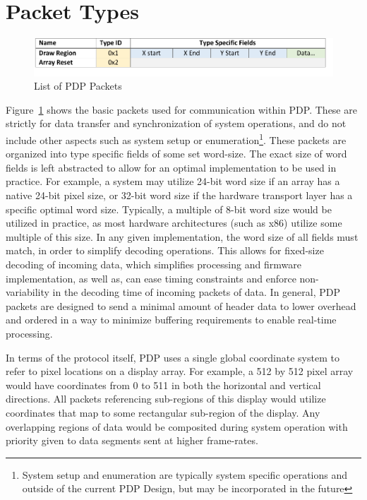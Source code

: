 

\section{Packet Types}

\begin{figure}
    \centering
    \includegraphics[width=1.0\textwidth]{fig/packet_chart.pdf}
    \caption{List of PDP Packets}
    \label{fig:packets}
\end{figure}

Figure~\ref{fig:packets} shows the basic packets used for communication within PDP. These are strictly for data transfer and synchronization of system operations, and do not include other aspects such as system setup or enumeration\footnote{System setup and enumeration are typically system specific operations and outside of the current PDP Design, but may be incorporated in the future}. These packets are organized into type specific fields of some set word-size. The exact size of word fields is left abstracted to allow for an optimal implementation to be used in practice. For example, a system may utilize 24-bit word size if an array has a native 24-bit pixel size, or 32-bit word size if the hardware transport layer has a specific optimal word size. Typically, a multiple of 8-bit word size would be utilized in practice, as most hardware architectures (such as x86) utilize some multiple of this size. In any given implementation, the word size of all fields must match, in order to simplify decoding operations. This allows for fixed-size decoding of incoming data, which simplifies processing and firmware implementation, as well as, can ease timing constraints and enforce non-variability in the decoding time of incoming packets of data. In general, PDP packets are designed to send a minimal amount of header data to lower overhead and ordered in a way to minimize buffering requirements to enable real-time processing.

In terms of the protocol itself, PDP uses a single global coordinate system to refer to pixel locations on a display array. For example, a 512 by 512 pixel array would have coordinates from 0 to 511 in both the horizontal and vertical directions. All packets referencing sub-regions of this display would utilize coordinates that map to some rectangular sub-region of the display. Any overlapping regions of data would be composited during system operation with priority given to data segments sent at higher frame-rates.


